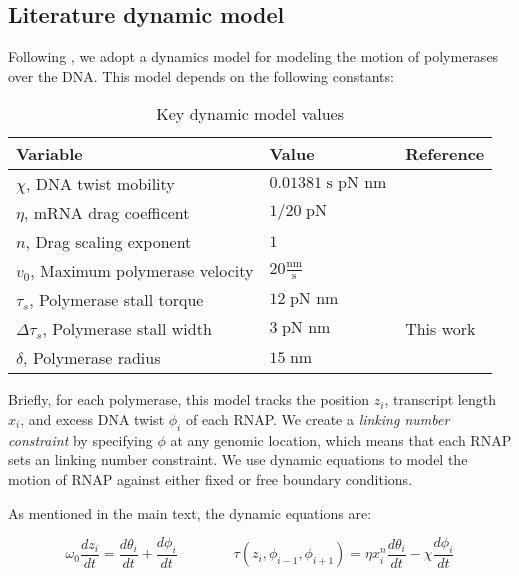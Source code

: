 \documentclass[11pt]{article}
\newcommand{\units}[2]{\frac{\text{#1}}{\text{#2}}\,}
\newcommand{\unit}[1]{\; \text{#1}\,}
\begin{document}
\subsection{Literature dynamic model}
Following \textcite{sevierPropertiesGeneExpression2018}, we adopt a dynamics model for modeling the motion of polymerases over the DNA. This model depends on the following constants:

\begin{table}[h]
    \centering
    \begin{tabular}{@{}lll@{}}
        \toprule
        Variable & Value & Reference \\
        \midrule
        \(\chi\), DNA twist mobility  & \(0.01381 \unit{s pN nm}\) & \parencite{sevierPropertiesGeneExpression2018} \\
        \(\eta\), mRNA drag coefficent  & \(1/20 \unit{pN}\) & \parencite{sevierPropertiesGeneExpression2018} \\
        \(n\), Drag scaling exponent  & \(1\) & \parencite{sevierPropertiesGeneExpression2018} \\
        \(v_0\), Maximum polymerase velocity  & \(20 \units{nm}{s}\) & \parencite{sevierPropertiesGeneExpression2018} \\
        \(\tau_s\), Polymerase stall torque  & \(12 \unit{pN nm}\) & \parencite{sevierPropertiesGeneExpression2018} \\
        \(\Delta \tau_s\), Polymerase stall width  & \(3 \unit{pN nm}\) & This work \\
        \(\delta\), Polymerase radius  & \(15 \unit{nm}\) & \parencite{sevierPropertiesGeneExpression2018} \\
        \bottomrule
    \end{tabular}
    \caption{Key dynamic model values}
    \label{tab:dynamic_model_constants}
\end{table}
\FloatBarrier
Briefly, for each polymerase, this model tracks the position \(z_i\), transcript length \(x_i\), and excess DNA twist \(\phi_i\) of each RNAP. We create a \emph{linking number constraint} by specifying \(\phi\) at any genomic location, which means that each RNAP sets an linking number constraint. We use dynamic equations to model the motion of RNAP against either fixed or free boundary conditions.

As mentioned in the main text, the dynamic equations are:

\begin{equation*}
    \omega_0 \frac{d z_i}{dt} = \frac{d \theta_i}{dt} + \frac{d \phi_i}{dt} \qquad \qquad \tau(z_i, \phi_{i-1}, \phi_{i+1}) = \eta x_i^n \frac{d\theta_i}{dt} - \chi \frac{d\phi_i}{dt}
\end{equation*}
\end{document}
